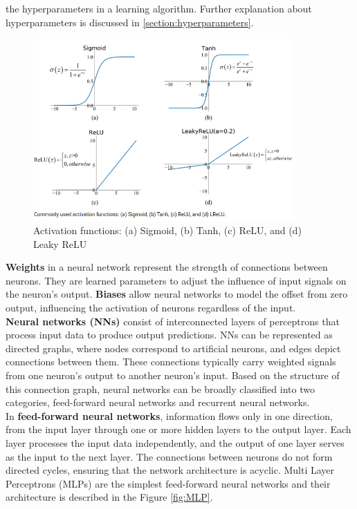 the hyperparameters in a learning algorithm. Further explanation about hyperparameters is discussed in \ref{section:hyperparameters}.\\
\begin{figure}[ht]
    \centering
    \includegraphics[width=10cm]{images/Theory-DL/ActGraphs.png}
    \caption{Activation functions: (a) Sigmoid, (b) Tanh, (c) ReLU, and (d) Leaky ReLU}
    \label{fig:ActGraphs}
  \end{figure}
\textbf{Weights} in a neural network represent the strength of connections between neurons. They are learned parameters to adjust the influence of input signals on the neuron's output. \textbf{Biases} allow neural networks to model the offset from zero output, influencing the activation of neurons regardless of the input.\\
\textbf{Neural networks (NNs)} consist of interconnected layers of perceptrons that process input data to produce output predictions. NNs can be represented as directed graphs, where nodes correspond to artificial neurons, and edges depict connections between them. These connections typically carry weighted signals from one neuron's output to another neuron's input. Based on the structure of this connection graph, neural networks can be broadly classified into two categories, feed-forward neural networks and recurrent neural networks.\\
In \textbf{feed-forward neural networks}, information flows only in one direction, from the input layer through one or more hidden layers to the output layer. Each layer processes the input data independently, and the output of one layer serves as the input to the next layer. The connections between neurons do not form directed cycles, ensuring that the network architecture is acyclic. Multi Layer Perceptrons (MLPs) are the simplest feed-forward neural networks and their architecture is described in the Figure \ref{fig:MLP}. \\
